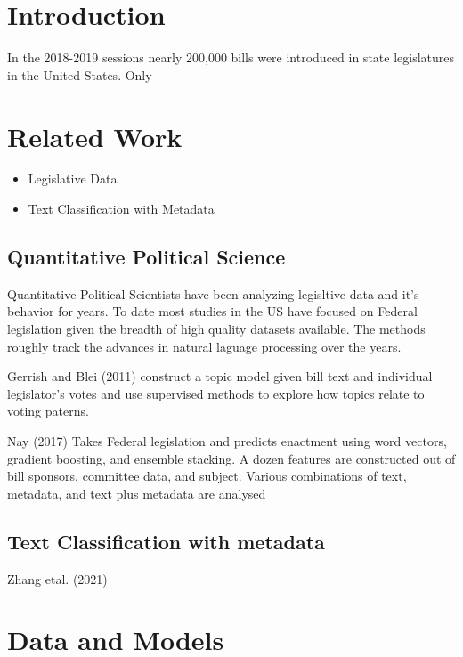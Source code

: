 \documentclass[11pt]{article}
\begin{document}
\section{Introduction}

In the 2018-2019 sessions nearly 200,000 bills were introduced in state legislatures in the United States. Only 

\section{Related Work}

\begin{itemize}
  \item Legislative Data
  \item Text Classification with Metadata
\end{itemize}


\subsection{Quantitative Political Science}

Quantitative Political Scientists have been analyzing legisltive data and it's behavior for years. To date most studies in the US have focused on Federal
legislation given the breadth of high quality datasets available. The methods roughly track the advances in natural laguage processing over the years.

Gerrish and Blei (2011)\cite{gerrish2011predicting} construct a topic model given bill text and individual legislator's votes and use supervised methods to explore how
topics relate to voting paterns.

Nay (2017) \cite{nay2017predicting} Takes Federal legislation and predicts enactment using word vectors, gradient boosting, and ensemble stacking. A dozen features
are constructed out of bill sponsors, committee data, and subject. Various combinations of text, metadata, and text plus metadata are analysed 

\subsection{Text Classification with metadata}

Zhang etal. (2021)\cite{zhang2021match}

\section{Data and Models}
\end{document}
